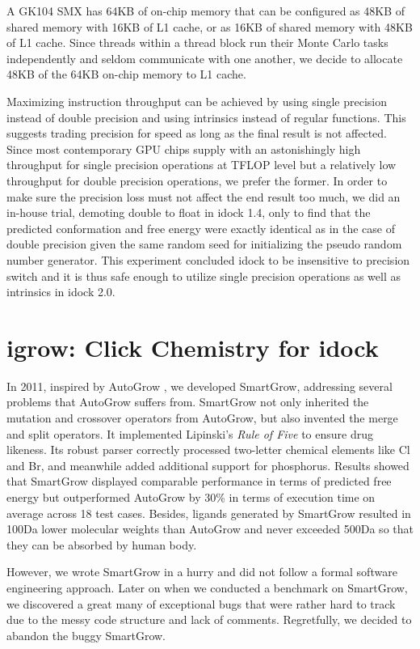 A GK104 SMX has 64KB of on-chip memory that can be configured as 48KB of shared memory with 16KB of L1 cache, or as 16KB of shared memory with 48KB of L1 cache. Since threads within a thread block run their Monte Carlo tasks independently and seldom communicate with one another, we decide to allocate 48KB of the 64KB on-chip memory to L1 cache.

Maximizing instruction throughput can be achieved by using single precision instead of double precision and using intrinsics instead of regular functions. This suggests trading precision for speed as long as the final result is not affected. Since most contemporary GPU chips supply with an astonishingly high throughput for single precision operations at TFLOP level but a relatively low throughput for double precision operations, we prefer the former. In order to make sure the precision loss must not affect the end result too much, we did an in-house trial, demoting double to float in idock 1.4, only to find that the predicted conformation and free energy were exactly identical as in the case of double precision given the same random seed for initializing the pseudo random number generator. This experiment concluded idock to be insensitive to precision switch and it is thus safe enough to utilize single precision operations as well as intrinsics in idock 2.0.

\section{igrow: Click Chemistry for idock}

In 2011, inspired by AutoGrow \citep{466}, we developed SmartGrow, addressing several problems that AutoGrow suffers from. SmartGrow not only inherited the mutation and crossover operators from AutoGrow, but also invented the merge and split operators. It implemented Lipinski's \textit{Rule of Five} \citep{168} to ensure drug likeness. Its robust parser correctly processed two-letter chemical elements like Cl and Br, and meanwhile added additional support for phosphorus. Results showed that SmartGrow displayed comparable performance in terms of predicted free energy but outperformed AutoGrow by 30\% in terms of execution time on average across 18 test cases. Besides, ligands generated by SmartGrow resulted in 100Da lower molecular weights than AutoGrow and never exceeded 500Da so that they can be absorbed by human body.

However, we wrote SmartGrow in a hurry and did not follow a formal software engineering approach. Later on when we conducted a benchmark on SmartGrow, we discovered a great many of exceptional bugs that were rather hard to track due to the messy code structure and lack of comments. Regretfully, we decided to abandon the buggy SmartGrow.

